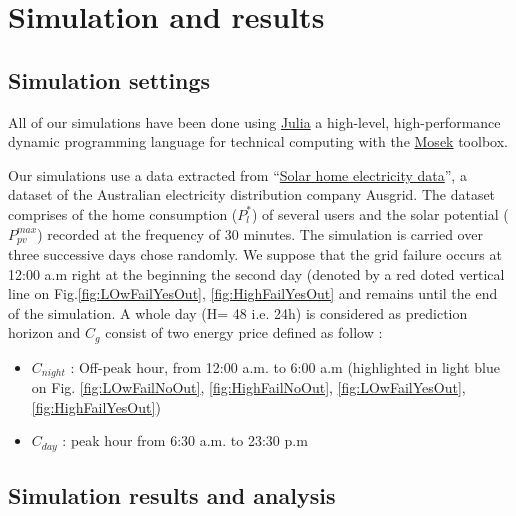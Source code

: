 \documentclass{ifacconf}
\begin{document}
 \section{Simulation and results}
 
 
 \subsection{Simulation settings}
 All of our simulations have been done using \href{http://www.juliaopt.org/}{Julia} a high-level, high-performance dynamic programming language for technical computing with the \href{https://www.mosek.com/}{Mosek} toolbox. 
 
 Our simulations use a data extracted from ``\href{https://www.ausgrid.com.au/Common/About-us/Corporate-information/Data-to-share/Solar-home-electricity-data.aspx}{Solar home electricity data}'', a dataset of the Australian electricity distribution company Ausgrid. The dataset comprises of the home consumption ($P_l^*$) of several users and the solar potential ($P^{max}_{pv}$) recorded at the frequency of 30 minutes. The simulation is carried over three successive days chose randomly. We suppose that the grid failure occurs at 12:00 a.m right at the beginning the second day (denoted by a red doted vertical line on Fig.\ref{fig:LOwFailYesOut}, \ref{fig:HighFailYesOut} and remains until the end of the simulation. A whole day (H= 48 i.e. 24h) is considered as prediction horizon and $C_{g}$ consist of two energy price defined as follow : 
\begin{itemize}
 \item $C_{night}$ : Off-peak hour, from 12:00 a.m. to 6:00 a.m (highlighted in light blue on Fig. \ref{fig:LOwFailNoOut}, \ref{fig:HighFailNoOut}, \ref{fig:LOwFailYesOut}, \ref{fig:HighFailYesOut})
 \item $C_{day}$ : peak hour from 6:30 a.m. to 23:30 p.m
\end{itemize}

 
 \subsection{Simulation results and analysis}
 
\end{document}
